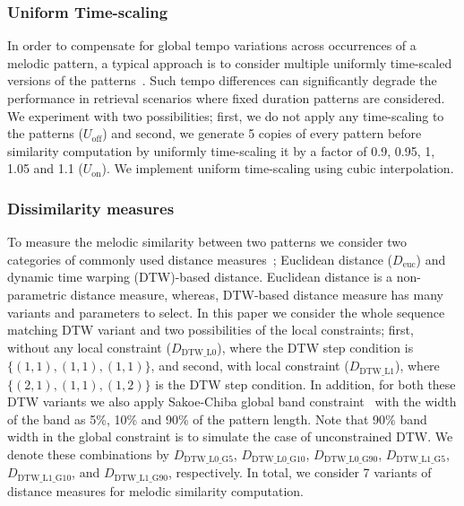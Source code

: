\subsubsection{Uniform Time-scaling}

In order to compensate for global tempo variations across occurrences of a melodic pattern, a typical approach is to consider multiple uniformly time-scaled versions of the patterns~\cite{mazzoni2001melody, kotsifakos2012survey}. Such tempo differences can significantly degrade the performance in retrieval scenarios where fixed duration patterns are considered. We experiment with two possibilities; first,  we do not apply any time-scaling to the patterns ($U_{\mathrm{off}}$) and second, we generate 5 copies of every pattern before similarity computation by uniformly time-scaling it by a factor of 0.9, 0.95, 1, 1.05 and 1.1 ($U_{\mathrm{on}}$). We implement uniform time-scaling using cubic interpolation.

\subsubsection{Dissimilarity measures}

To measure the melodic similarity between two patterns we consider two categories of commonly used distance measures~\cite{Ross2012b, Rao2014, muller2007information}; Euclidean distance ($D_{\mathrm{euc}}$) and dynamic time warping (DTW)-based distance. Euclidean distance is a non-parametric distance measure, whereas, DTW-based distance measure has many variants and parameters to select. In this paper we consider the whole sequence matching DTW variant and two possibilities of the local constraints; first, without any local constraint ($D_{\mathrm{DTW\_L0}}$), where the DTW step condition is $\lbrace(1,1), (1,1), (1,1)\rbrace$, and second, with local constraint ($D_{\mathrm{DTW\_L1}}$), where $\lbrace(2,1), (1,1), (1,2)\rbrace$ is the DTW step condition. In addition, for both these DTW variants we also apply Sakoe-Chiba global band constraint~\cite{Sakoe78TASLP} with the width of the band as 5\%, 10\% and 90\% of the pattern length. Note that 90\% band width in the global constraint is to simulate the case of unconstrained DTW. We denote these combinations by $D_{\mathrm{DTW\_L0\_G5}}$, $D_{\mathrm{DTW\_L0\_G10}}$, $D_{\mathrm{DTW\_L0\_G90}}$, $D_{\mathrm{DTW\_L1\_G5}}$, $D_{\mathrm{DTW\_L1\_G10}}$, and $D_{\mathrm{DTW\_L1\_G90}}$, respectively. In total, we consider 7 variants of distance measures for melodic similarity computation.

